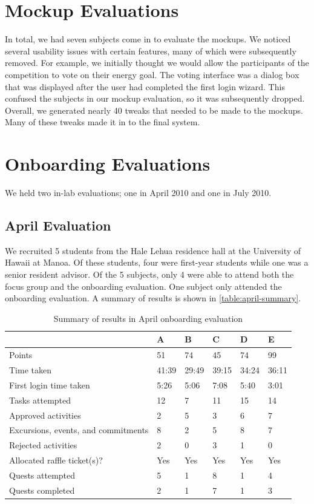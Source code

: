 \section{Mockup Evaluations}

In total, we had seven subjects come in to evaluate the mockups. We noticed several usability issues with certain features, many of which were subsequently removed. For example, we initially thought we would allow the participants of the competition to vote on their energy goal. The voting interface was a dialog box that was displayed after the user had completed the first login wizard. This confused the subjects in our mockup evaluation, so it was subsequently dropped. Overall, we generated nearly 40 tweaks that needed to be made to the mockups. Many of these tweaks made it in to the final system.

\section{Onboarding Evaluations}

We held two in-lab evaluations; one in April 2010 and one in July 2010.

\subsection{April Evaluation}

We recruited 5 students from the Hale Lehua residence hall at the University of Hawaii at Manoa. Of these students, four were first-year students while one was a senior resident advisor. Of the 5 subjects, only 4 were able to attend both the focus group and the onboarding evaluation. One subject only attended the onboarding evaluation. A summary of results is shown in \autoref{table:april-summary}.

\begin{table}[t]
	\begin{tabular}{| l || p{1cm} | p{1cm} | p{1cm} | p{1cm} | p{1cm} |}
		\hline
		& A & B & C & D & E \\
		\hline
		Points & 51 & 74 & 45 & 74 & 99 \\
		Time taken & 41:39 & 29:49 & 39:15 & 34:24 & 36:11 \\
		First login time taken & 5:26 & 5:06 & 7:08 & 5:40 & 3:01 \\
		Tasks attempted & 12 & 7 & 11 & 15 & 14 \\
		Approved activities & 2 & 5 & 3 & 6 & 7 \\
		Excursions, events, and commitments & 8 & 2 & 5 & 8 & 7 \\
		Rejected activities & 2 & 0 & 3 & 1 & 0 \\
		Allocated raffle ticket(s)? & Yes & Yes & Yes & Yes & Yes \\
		Quests attempted & 5 & 1 & 8 & 1 & 4 \\
		Quests completed & 2 & 1 & 7 & 1 & 3 \\
		\hline
	\end{tabular}
	\caption{Summary of results in April onboarding evaluation}
	\label{table:april-summary}
\end{table}

